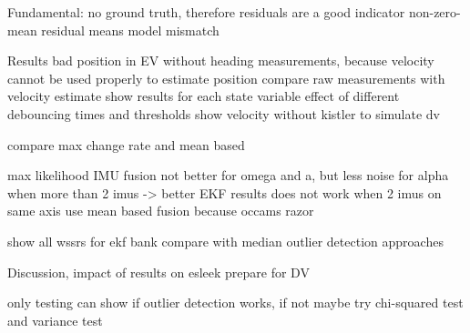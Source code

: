 

Fundamental: no ground truth, therefore residuals are a good indicator
non-zero-mean residual means model mismatch~\cite[p.~158]{AlexanderWischnewski.2019}

Results
bad position in EV without heading measurements, because velocity cannot be used properly to estimate position
compare raw measurements with velocity estimate
show results for each state variable
effect of different debouncing times and thresholds
show velocity without kistler to simulate dv

compare max change rate and mean based

max likelihood IMU fusion not better for omega and a, but less noise for alpha when more than 2 imus -> better EKF results
does not work when 2 imus on same axis
use mean based fusion because occams razor

show all wssrs for ekf bank
compare with median outlier detection approaches


Discussion, impact of results on esleek
prepare for DV

only testing can show if outlier detection works, if not maybe try chi-squared test and variance test
